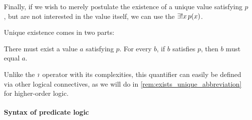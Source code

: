 \begin{concept}
\begin{thmenum}
     Finally, if we wish to merely postulate the existence of a unique value satisfying \( p \), but are not interested in the value itself, we can use the  \( \qExists* x p(x) \).

    Unique existence comes in two parts:
    \begin{thmenum}
       There must exist a value \( a \) satisfying \( p \).
       For every \( b \), if \( b \) satisfies \( p \), then \( b \) must equal \( a \).
    \end{thmenum}

    Unlike the \( \rotiota \) operator with its complexities, this quantifier can easily be defined via other logical connectives, as we will do in \cref{rem:exists_unique_abbreviation} for higher-order logic.
  \end{thmenum}
\end{concept}

\paragraph{Syntax of predicate logic}

